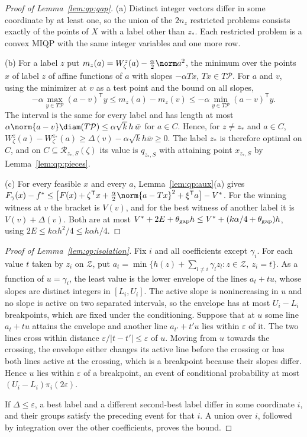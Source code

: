 \begin{proof}[Proof of Lemma~\ref{lem:qp:gap}]
(a) Distinct integer vectors differ in some coordinate by at least one, so the
union of the $2n_z$ restricted problems consists exactly of the points of $X$
with a label other than $z_*$. Each restricted problem is a convex MIQP with
the same integer variables and one more row.

(b) For a label $z$ put $m_z(a)=W^z_\zeta(a)-\frac\alpha2\norm a^2$, the
minimum over the points $x$ of label $z$ of affine functions of $a$ with
slopes $-\alpha Tx$, $Tx\in T\mathcal P$. For $a$ and $v$, using the minimizer
at $v$ as a test point and the bound on all slopes,
\[
 -\alpha\max_{y\in T\mathcal P}(a-v)^{\mathsf T} y\le m_z(a)-m_z(v)\le-\alpha\min_{y\in T\mathcal P}(a-v)^{\mathsf T} y .
\]
The interval is the same for every label and has length at most
$\alpha\norm{a-v}\diam(T\mathcal P)\le\alpha\sqrt k\,h\,\bar w$ for $a\in C$.
Hence, for $z\ne z_*$ and $a\in C$,
$W^z_\zeta(a)-W^{z_*}_\zeta(a)\ge\Delta(v)-\alpha\sqrt kh\bar w\ge0$. The label
$z_*$ is therefore optimal on $C$, and on $C\subseteq\mathcal R_{z_*,S}(\zeta)$
its value is $q_{z_*,S}$ with attaining point $x_{z_*,S}$ by
Lemma~\ref{lem:qp:pieces}.

(c) For every feasible $x$ and every $a$, Lemma~\ref{lem:qp:aux}(a) gives
$F_\gamma(x)-f^*\le\bigl[F(x)+\zeta^{\mathsf T} x+\frac\alpha2\norm{a-Tx}^2+\xi^{\mathsf T} a\bigr]-V^*$.
For the winning witness at $v$ the bracket is $V(v)$, and for the best
witness of another label it is $V(v)+\Delta(v)$. Both are at most
$V^*+2E+\theta_{\rm gap}h\le V^*+(k\alpha/4+\theta_{\rm gap})h$, using
$2E\le k\alpha h^2/4\le k\alpha h/4$.
\end{proof}

\begin{proof}[Proof of Lemma~\ref{lem:qp:isolation}]
Fix $i$ and all coefficients except $\gamma_i$. For each value $t$ taken by
$z_i$ on $\mathcal Z$, put
$a_t=\min\{h(z)+\sum_{l\ne i}\gamma_lz_l:z\in\mathcal Z,\ z_i=t\}$. As a
function of $u=\gamma_i$, the least value is the lower envelope of the lines
$a_t+tu$, whose slopes are distinct integers in $[L_i,U_i]$. The active slope
is nonincreasing in $u$ and no slope is active on two separated intervals, so
the envelope has at most $U_i-L_i$ breakpoints, which are fixed under the
conditioning. Suppose that at $u$ some line $a_t+tu$ attains the envelope and
another line $a_{t'}+t'u$ lies within $\varepsilon$ of it. The two lines
cross within distance $\varepsilon/|t-t'|\le\varepsilon$ of $u$. Moving from
$u$ towards the crossing, the envelope either changes its active line before
the crossing or has both lines active at the crossing, which is a breakpoint
because their slopes differ. Hence $u$ lies within $\varepsilon$ of a
breakpoint, an event of conditional probability at most
$(U_i-L_i)\pi_i(2\varepsilon)$.

If $\Delta\le\varepsilon$, a best label and a different second-best label
differ in some coordinate $i$, and their groups satisfy the preceding event
for that $i$. A union over $i$, followed by integration over the other
coefficients, proves the bound.
\end{proof}

